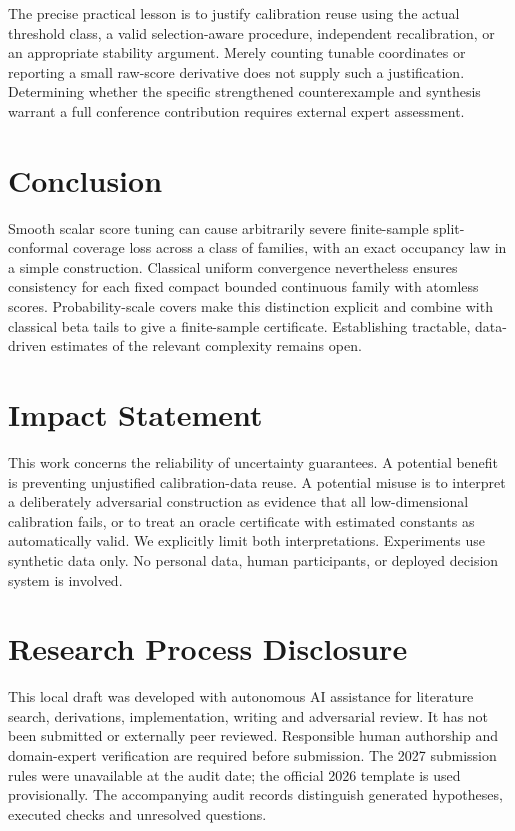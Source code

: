 \documentclass{article}
\begin{document}
The precise practical lesson is to justify calibration reuse using the actual threshold class, a valid selection-aware procedure, independent recalibration, or an appropriate stability argument. Merely counting tunable coordinates or reporting a small raw-score derivative does not supply such a justification. Determining whether the specific strengthened counterexample and synthesis warrant a full conference contribution requires external expert assessment.

\section{Conclusion}

Smooth scalar score tuning can cause arbitrarily severe finite-sample split-conformal coverage loss across a class of families, with an exact occupancy law in a simple construction. Classical uniform convergence nevertheless ensures consistency for each fixed compact bounded continuous family with atomless scores. Probability-scale covers make this distinction explicit and combine with classical beta tails to give a finite-sample certificate. Establishing tractable, data-driven estimates of the relevant complexity remains open.

\section*{Impact Statement}
This work concerns the reliability of uncertainty guarantees. A potential benefit is preventing unjustified calibration-data reuse. A potential misuse is to interpret a deliberately adversarial construction as evidence that all low-dimensional calibration fails, or to treat an oracle certificate with estimated constants as automatically valid. We explicitly limit both interpretations. Experiments use synthetic data only. No personal data, human participants, or deployed decision system is involved.

\section*{Research Process Disclosure}
This local draft was developed with autonomous AI assistance for literature search, derivations, implementation, writing and adversarial review. It has not been submitted or externally peer reviewed. Responsible human authorship and domain-expert verification are required before submission. The 2027 submission rules were unavailable at the audit date; the official 2026 template is used provisionally. The accompanying audit records distinguish generated hypotheses, executed checks and unresolved questions.
\end{document}
